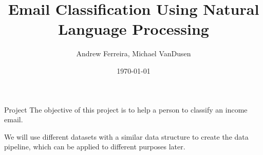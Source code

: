 \documentclass{beamer}
\title{Email Classification Using Natural Language Processing}
\author{Andrew Ferreira, Michael VanDusen}
\date{\today}
\begin{document}
\begin{frame}
    \titlepage
\end{frame}


\begin{frame}{Project}
The objective of this project is to help a person to classify an income email. 

We will use different datasets with a similar data structure to create the data pipeline, which can be applied to different purposes later. 
\end{frame}
\end{document}
